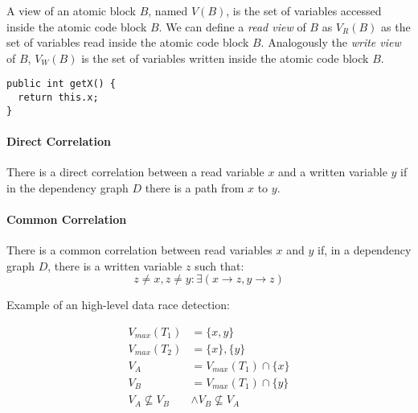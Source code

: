 A view of an atomic block $B$, named $V(B)$, is the set of variables accessed inside the atomic code block $B$.
We can define a \textit{read view} of $B$ as $V_{R}(B)$ as the set of variables read inside the atomic code block $B$.
Analogously the \textit{write view} of $B$, $V_{W}(B)$ is the set of variables written inside the atomic code block $B$.

\begin{lstlisting}[caption={
  The \texttt{getX} has the read view $V_{R}(\mathtt{getX}) = \{\mathtt{x}\}$ and the write view $V_{W}(\mathtt{getX}) = \{\}$.
}]
public int getX() {
  return this.x;
}
\end{lstlisting}

\paragraph{Direct Correlation}
There is a direct correlation between a read variable $x$ and a written variable $y$ if in the dependency graph $D$ there is a path from $x$ to $y$.

\paragraph{Common Correlation}
There is a common correlation between read variables $x$ and $y$ if,
in a dependency graph $D$, there is a written variable $z$ such that:
\begin{equation*}
  z \neq x, z \neq y : \exists \left(x \rightarrow z, y \rightarrow z\right)
\end{equation*}

Example of an high-level data race detection:

\begin{equation}
  \begin{split}
    V_{max}(T_1) & = \{x, y\} \\
    V_{max}(T_2) & = \{x\}, \{y\} \\
    V_A & = V_{max}(T_1) \cap \{x\} \\
    V_B & = V_{max}(T_1) \cap \{y\} \\
    V_A \nsubseteq V_B & \wedge V_B \nsubseteq V_A
  \end{split}
\end{equation}
